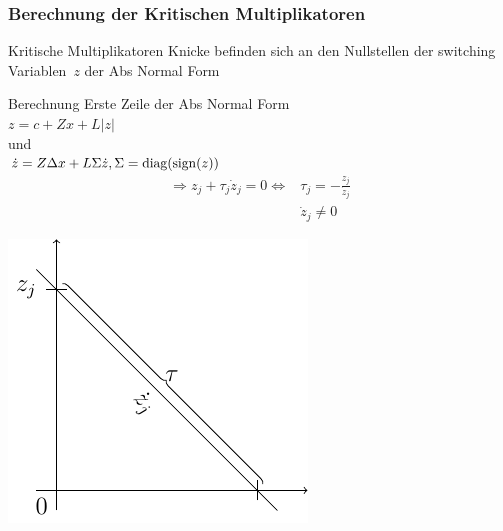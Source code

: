 \begin{frame}[<+->]
\frametitle{Berechnung der Kritischen Multiplikatoren}
\begin{minipage}{0.5\textwidth} 
	\begin{block}{Kritische Multiplikatoren}
	 \glqq Knicke befinden sich an den Nullstellen der switching Variablen~$z$ der Abs Normal Form \grqq
	\end{block}
	\begin{block}{Berechnung}
	   Erste Zeile der Abs Normal Form\\
	   $ z = c+ Zx+L|z|$\\
	    und\\
	   $\dot z = Z\Delta x+L\Sigma \dot z, \Sigma = \operatorname{diag}(\operatorname{sign}(z))$
	    \begin{align*}
	    \Rightarrow z_j + \tau_j \dot z_j = 0 \iff & \tau_j = -\frac{z_j}{\dot z_j}\\
						       & \dot z_j\neq 0
	    \end{align*}
	\end{block}
	\end{minipage}
	\hfill
	\begin{minipage}{0.4\textwidth}
	\includegraphics[width=\linewidth]{../dipl_tex/img/tikz/finding_kinks.pdf}	
	\end{minipage}
\end{frame}
